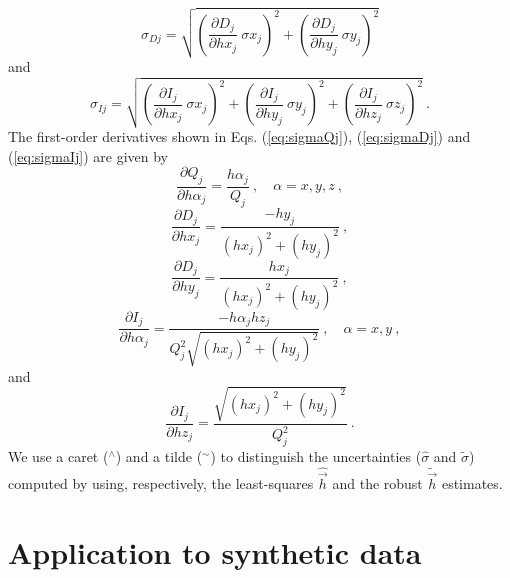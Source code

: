 \documentclass[journal abbreviation, npg]{copernicus}
\begin{document}
\begin{equation}
\sigma_{Dj} = \sqrt{\left( \frac{\partial D_{j}}{\partial hx_{j}} \: \sigma x_{j} \right)^{2} +
                    \left( \frac{\partial D_{j}}{\partial hy_{j}} \: \sigma y_{j} \right)^{2}}
\label{eq:sigmaDj}
\end{equation}
and
\begin{equation}
\sigma_{Ij} = \sqrt{\left( \frac{\partial I_{j}}{\partial hx_{j}} \: \sigma x_{j} \right)^{2} +
                    \left( \frac{\partial I_{j}}{\partial hy_{j}} \: \sigma y_{j} \right)^{2} +
                    \left( \frac{\partial I_{j}}{\partial hz_{j}} \: \sigma z_{j} \right)^{2}} \: .
\label{eq:sigmaIj}
\end{equation}
The first-order derivatives shown in Eqs. (\ref{eq:sigmaQj}), (\ref{eq:sigmaDj}) and (\ref{eq:sigmaIj}) are given by
\begin{equation}
\dfrac{\partial Q_{j}}{\partial h \alpha_{j}} = \dfrac{h \alpha_{j}}{Q_{j}} \: , \quad \alpha = x, y, z \: ,
\label{eq:dQj-dhalphaj}
\end{equation}
\begin{equation}
\frac{\partial D_{j}}{\partial hx_{j}} = \dfrac{- hy_{j}}{ \left( hx_{j} \right)^{2} + \left( hy_{j} \right)^{2}} \: ,
\label{eq:dDj-dhxj}
\end{equation}
\begin{equation}
\frac{\partial D_{j}}{\partial hy_{j}} = \dfrac{ hx_{j} }{ \left( hx_{j} \right)^{2} + \left( hy_{j} \right)^{2}} \: ,
\label{eq:dDj-dhyj}
\end{equation}
\begin{equation}
\frac{\partial I_{j}}{\partial h \alpha_{j}} = \dfrac{-h \alpha_{j} hz_{j}}{Q_{j}^{2} \sqrt{\left( hx_{j} \right)^{2} + \left( hy_{j} \right)^{2}}} \: , \quad \alpha = x, y \: ,
\label{eq:dIj-dhalphaj}
\end{equation}
and
\begin{equation}
\frac{\partial I_{j}}{\partial hz_{j}} = \dfrac{ \sqrt{\left( hx_{j} \right)^{2} + \left( hy_{j} \right)^{2}} }{Q_{j}^{2}} \: .
\label{eq:dIj-dhzj}
\end{equation}
We use a caret ($^{\wedge}$) and a tilde ($^{\sim}$) to distinguish the uncertainties ($\hat{\sigma}$ and $\tilde{\sigma}$) computed by using, respectively, the least-squares $\hat{\vec{h}}$ and the robust $\tilde{\vec{h}}$ estimates.

\section{Application to synthetic data}
\end{document}
